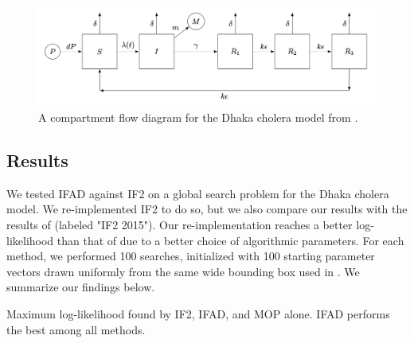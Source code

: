 \documentclass[9pt,twocolumn,pnasresearcharticle]{pnas-new}
\newcommand\arxiv[2]{#2} %
\begin{document}
\begin{figure}
    \centering
    \includegraphics[width=\arxiv{14cm}{\textwidth/2}]{imgs/095/tikzcholera.png}
    \vspace*{-7mm}
    \caption{A compartment flow diagram for the Dhaka cholera model from \cite{king08}.}
    \label{fig:tikz-cholera}
    \arxiv{}{\vspace*{-3mm}}
\end{figure}

\arxiv{}{\vspace*{-2mm}}
\subsection{Results}

We tested IFAD against IF2 on a global search problem for the Dhaka cholera model.
We re-implemented IF2 to do so, but we also compare our results with the results of \cite{ionides15} (labeled "IF2 2015").
Our re-implementation reaches a better log-likelihood than that of \cite{ionides15} due to a better choice of algorithmic parameters.
For each method, we performed 100 searches, initialized with 100 starting parameter vectors drawn uniformly from the same wide bounding box used in \cite{ionides15}. We summarize our findings below. 

  
\arxiv{}{\vspace*{-1mm}}
\begin{table}[htbp!]
\centering

\caption{Maximum log-likelihood found by IF2, IFAD, and MOP alone. IFAD performs the best among all methods.}
\arxiv{}{\vspace*{-7mm}}
\label{table:mle}
\end{table}
\end{document}
